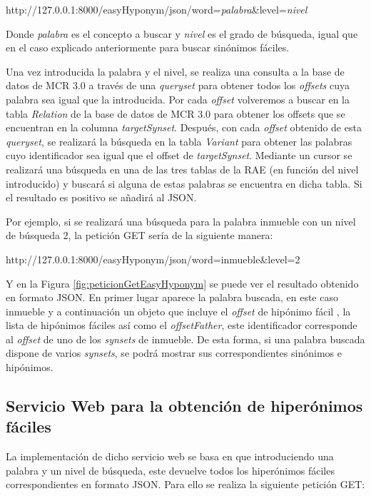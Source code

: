 http://127.0.0.1:8000/easyHyponym/json/word=\textit{palabra}\&level=\textit{nivel}

Donde \textit{palabra} es el concepto a buscar y \textit{nivel} es el grado de búsqueda, igual que en el caso explicado anteriormente para buscar sinónimos fáciles.

Una vez introducida la palabra y el nivel, se realiza una consulta a la base de datos de MCR 3.0 a través de una \textit{queryset} para obtener todos los \textit{offsets} cuya palabra sea igual que la introducida.
Por cada \textit{offset} volveremos a buscar en la tabla \textit{Relation} de la base de datos de MCR 3.0 para obtener los offsets que se encuentran en la columna \textit{targetSynset}. Después, con cada \textit{offset} obtenido de esta \textit{queryset}, se realizará la búsqueda en la tabla \textit{Variant} para obtener las palabras cuyo identificador sea igual que el offset de \textit{targetSynset}.
Mediante un cursor se realizará una búsqueda en una de las tres tablas de la RAE (en función del nivel introducido) y buscará si alguna de estas palabras se encuentra en dicha tabla.
Si el resultado es positivo se añadirá al JSON.

Por ejemplo, si se realizará una búsqueda para la palabra inmueble con un nivel de búsqueda 2, la petición GET sería de la siguiente manera:

http://127.0.0.1:8000/easyHyponym/json/word=inmueble\&level=2

Y en la Figura \ref{fig:peticionGetEasyHyponym} se puede ver el resultado obtenido en formato JSON. En primer lugar aparece la palabra buscada, en este caso inmueble y a continuación un objeto que incluye el \textit{offset} de hipónimo fácil , la lista de hipónimos fáciles así como el \textit{offsetFather}, este identificador corresponde al \textit{offset} de uno de los \textit{synsets} de inmueble. De esta forma, si una palabra buscada dispone de varios \textit{synsets}, se podrá mostrar sus correspondientes sinónimos e hipónimos.


\subsection{Servicio Web  para la obtención de hiperónimos fáciles}
\label{cap:subsec:sw_hiperonimosfaciles}
La implementación de dicho servicio web se basa en que introduciendo una palabra y un nivel de búsqueda, este devuelve todos los hiperónimos fáciles correspondientes en formato JSON. Para ello se realiza la siguiente petición GET:

